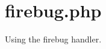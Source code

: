 \hypertarget{firebug_8php-example}{
\section{firebug.php}
}
Using the firebug handler.


\begin{DoxyCodeInclude}
\end{DoxyCodeInclude}
 